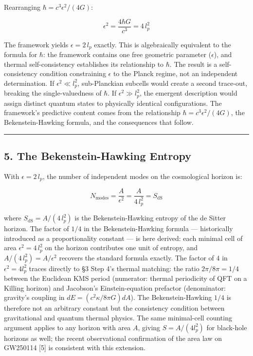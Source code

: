 \documentclass[
]{article}
\begin{document}
Rearranging \(\hbar = c^3 \epsilon^2 / (4G)\):

\[\epsilon^2 = \frac{4\hbar G}{c^3} = 4\,l_p^2\]

The framework yields \(\epsilon = 2\,l_p\) exactly. This is
algebraically equivalent to the formula for \(\hbar\): the framework
contains one free geometric parameter (\(\epsilon\)), and thermal
self-consistency establishes its relationship to \(\hbar\). The result
is a self-consistency condition constraining \(\epsilon\) to the Planck
regime, not an independent determination. If \(\epsilon^2 \ll l_p^2\),
sub-Planckian subcells would create a second trace-out, breaking the
single-valuedness of \(\hbar\). If \(\epsilon^2 \gg l_p^2\), the
emergent description would assign distinct quantum states to physically
identical configurations. The framework's predictive content comes from
the relationship \(\hbar = c^3 \epsilon^2/(4G)\), the Bekenstein-Hawking
formula, and the consequences that follow.

\begin{center}\rule{0.5\linewidth}{0.5pt}\end{center}

\hypertarget{the-bekenstein-hawking-entropy}{%
\subsection{5. The Bekenstein-Hawking
Entropy}\label{the-bekenstein-hawking-entropy}}

With \(\epsilon = 2\,l_p\), the number of independent modes on the
cosmological horizon is:

\[N_{\text{modes}} = \frac{A}{\epsilon^2} = \frac{A}{4\,l_p^2} = S_{\text{dS}}\]

where \(S_{\text{dS}} = A/(4\,l_p^2)\) is the Bekenstein-Hawking entropy
of the de Sitter horizon. The factor of \(1/4\) in the
Bekenstein-Hawking formula --- historically introduced as a
proportionality constant --- is here derived: each minimal cell of area
\(\epsilon^2 = 4\,l_p^2\) on the horizon contributes one unit of
entropy, and \(A / (4\,l_p^2) = A / \epsilon^2\) recovers the standard
formula exactly. The factor of \(4\) in \(\epsilon^2 = 4 l_p^2\) traces
directly to §3 Step 4's thermal matching: the ratio \(2\pi/8\pi = 1/4\)
between the Euclidean KMS period (numerator: thermal periodicity of QFT
on a Killing horizon) and Jacobson's Einstein-equation prefactor
(denominator: gravity's coupling in \(dE = (c^2\kappa/8\pi G)dA\)). The
Bekenstein-Hawking \(1/4\) is therefore not an arbitrary constant but
the consistency condition between gravitational and quantum thermal
physics. The same minimal-cell counting argument applies to any horizon
with area \(A\), giving \(S = A/(4 l_p^2)\) for black-hole horizons as
well; the recent observational confirmation of the area law on GW250114
{[}5{]} is consistent with this extension.
\end{document}
